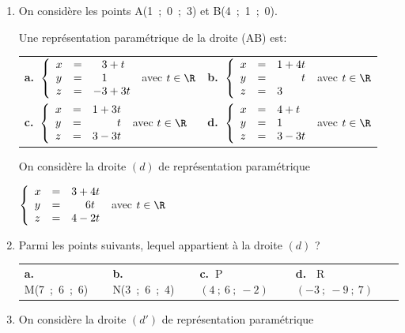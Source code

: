 \begin{enumerate}
\item On considère les points A(1~;~0~;~3) et B(4~;~1~;~0).

Une représentation paramétrique de la droite (AB) est:

\begin{center}
\begin{tabularx}{\linewidth}{*{2}{X}}
\textbf{a.~}$\left\{\begin{array}{l c l}
x &=& \phantom{-}3 + t \\
y &=& \phantom{-}1\\
z &=& - 3 +3t
\end{array}\right.$ avec $t \in \R$&\textbf{b.~}$\left\{\begin{array}{l c l}
x &=& 1+4t\\
y &=&\phantom{1 + 4}t\\
z &=& 3\end{array}\right.$ avec $t \in \R$\\
\textbf{c.~}$\left\{\begin{array}{l c l}
x &=& 1 + 3t\\
y &=&\phantom{1 + 3}t\\
z&=&3 - 3t
\end{array}\right.$ avec $t \in \R$&\textbf{d.~}$\left\{\begin{array}{l c l}
x&=&4 + t\\
y&=&1\\
z&=&3 - 3t
\end{array}\right.$ avec $t \in \R$
\end{tabularx}
\end{center}

On considère la droite $(d)$ de représentation paramétrique 

$\left\{\begin{array}{l c l}
x&=&3 + 4t\\
y&=&\phantom{3 + }6t\\
z&=&4 - 2t
\end{array}\right.$ avec $t \in \R$

\item Parmi les points suivants, lequel appartient à la droite $(d)$ ?
\begin{center}
\begin{tabularx}{\linewidth}{*{4}{X}}
\textbf{a.~} M(7~;~6~;~6) &\textbf{b.~} N(3~;~6~;~4) &\textbf{c.~}P$(4~;~6~;~-2)$&\textbf{d.~} R$(-3~;~-9~;~7)$
\end{tabularx}
\end{center}
\item On considère la droite $(d')$ de représentation paramétrique 


\end{enumerate}

